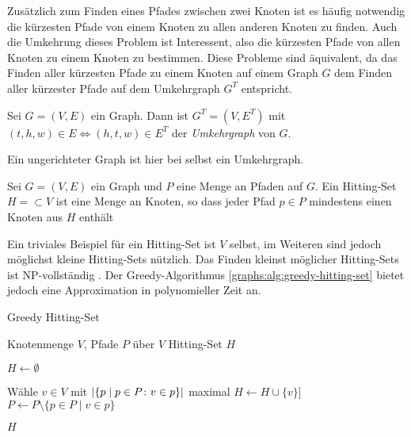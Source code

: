 Zusätzlich zum Finden eines Pfades zwischen zwei Knoten ist es häufig notwendig die kürzesten Pfade von einem Knoten zu allen anderen Knoten zu finden.
Auch die Umkehrung dieses Problem ist Interessent, also die kürzesten Pfade von allen Knoten zu einem Knoten zu bestimmen.
Diese Probleme sind äquivalent, da das Finden aller kürzesten Pfade zu einem Knoten auf einem Graph $G$ dem Finden aller kürzester Pfade auf dem Umkehrgraph $G^T$ entspricht.

\begin{definition}[Umkehrgraph]
    Sei $G = (V, E)$ ein Graph. Dann ist $G^T = (V, E^T)$ mit $(t, h, w) \in E \Leftrightarrow (h, t, w) \in E^T$ der \emph{Umkehrgraph} von $G$.
\end{definition}

Ein ungerichteter Graph ist hier bei selbst ein Umkehrgraph.

\begin{definition}
    Sei $G = (V, E)$ ein Graph und $P$ eine Menge an Pfaden auf $G$.
    Ein Hitting-Set $H = \subset V$ ist eine Menge an Knoten, so dass jeder Pfad $p \in P$ mindestens einen Knoten aus $H$ enthält
\end{definition}

Ein triviales Beispiel für ein Hitting-Set ist $V$ selbst, im Weiteren sind jedoch möglichst kleine Hitting-Sets nützlich.
Das Finden kleinst möglicher Hitting-Sets ist NP-vollständig \cite{Kar72}.
Der Greedy-Algorithmus \ref{graphs:alg:greedy-hitting-set} bietet jedoch eine Approximation in polynomieller Zeit an.

\begin{algorithm}
    \caption{Greedy Hitting-Set}
    \begin{algorithmic}[1]
        \Require Knotenmenge $V$, Pfade $P$ über $V$
        \Ensure Hitting-Set $H$

        \State $H \gets \emptyset$

        \State

        \State Wähle $v \in V$ mit $\abs{ \{ p \mid p \in P \colon v \in p \}}$ maximal
        \State $H \gets H \cup \{  v \}]$
        \State $P \gets P \setminus \{p \in P \mid v \in p\}$
        \EndWhile

        \State

        \State \Return $H$
    \end{algorithmic}
    \label{graphs:alg:greedy-hitting-set}
\end{algorithm}


